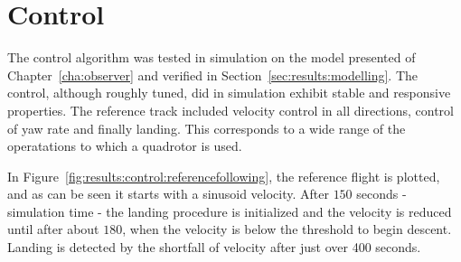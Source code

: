 \section{Control}
\label{sec:results:control}
    The control algorithm was tested in simulation on the model presented
    of Chapter~\ref{cha:observer} and verified in Section~\ref{sec:results:modelling}.
    The control, although roughly tuned, did in simulation exhibit stable and responsive
    properties. The reference track included velocity control in all directions,
    control of yaw rate and finally landing. This corresponds to a wide
    range of the operatations to which a quadrotor is used.

    In Figure~\ref{fig:results:control:referencefollowing}, the reference
    flight is plotted, and as can be seen it starts with a sinusoid velocity.
    After $150$ seconds - simulation time - the landing procedure is initialized and the velocity is
    reduced until after about $180$, when the velocity is below the threshold
    to begin descent. Landing is detected by the shortfall of velocity
    after just over 400 seconds.

